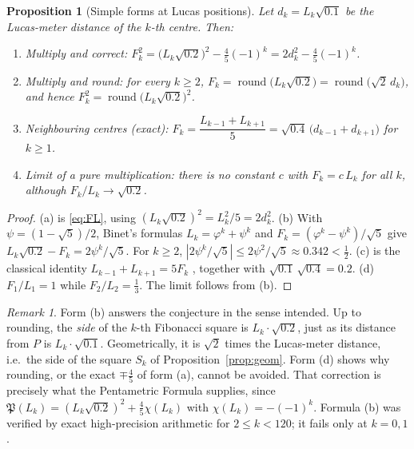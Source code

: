 \documentclass[11pt,a4paper]{article}
\newcommand{\Pent}{\mathfrak{P}}                      %
\theoremstyle{plain}
\newtheorem{proposition}[theorem]{Proposition}
\theoremstyle{definition}
\theoremstyle{remark}
\newtheorem{remark}[theorem]{Remark}
\begin{document}
\begin{proposition}[Simple forms at Lucas positions]\label{prop:simple}
Let $d_k=L_k\sqrt{0.1}$ be the Lucas-meter distance of the $k$-th centre. Then:
\begin{enumerate}[label=(\alph*),itemsep=3pt]
  \item \emph{Multiply and correct:} $F_k^{2}=\bigl(L_k\sqrt{0.2}\bigr)^{2}-\tfrac45(-1)^{k}=2d_k^{2}-\tfrac45(-1)^{k}$.
  \item \emph{Multiply and round:} for every $k\ge2$, $F_k=\operatorname{round}\bigl(L_k\sqrt{0.2}\bigr)=\operatorname{round}\bigl(\sqrt2\,d_k\bigr)$, and hence $F_k^{2}=\operatorname{round}\bigl(L_k\sqrt{0.2}\bigr)^{2}$.
  \item \emph{Neighbouring centres (exact):} $F_k=\dfrac{L_{k-1}+L_{k+1}}{5}=\sqrt{0.4}\,\bigl(d_{k-1}+d_{k+1}\bigr)$ for $k\ge1$.
  \item \emph{Limit of a pure multiplication:} there is no constant $c$ with $F_k=c\,L_k$ for all $k$, although $F_k/L_k\to\sqrt{0.2}$.
\end{enumerate}
\end{proposition}

\begin{proof}
(a) is \eqref{eq:FL}, using $(L_k\sqrt{0.2})^{2}=L_k^{2}/5=2d_k^{2}$.
(b) With $\psi=(1-\sqrt5)/2$, Binet's formulas $L_k=\varphi^{k}+\psi^{k}$ and $F_k=(\varphi^{k}-\psi^{k})/\sqrt5$ give $L_k\sqrt{0.2}-F_k=2\psi^{k}/\sqrt5$. For $k\ge2$, $|2\psi^{k}/\sqrt5|\le2\psi^{2}/\sqrt5\approx0.342<\tfrac12$.
(c) is the classical identity $L_{k-1}+L_{k+1}=5F_k$ \cite{Koshy2001}, together with $\sqrt{0.1}\,\sqrt{0.4}=0.2$.
(d) $F_1/L_1=1$ while $F_2/L_2=\tfrac13$. The limit follows from (b).
\end{proof}

\begin{remark}
Form (b) answers the conjecture in the sense intended. Up to rounding, the \emph{side} of the $k$-th Fibonacci square is $L_k\cdot\sqrt{0.2}$, just as its distance from $P$ is $L_k\cdot\sqrt{0.1}$. Geometrically, it is $\sqrt2$ times the Lucas-meter distance, i.e.\ the side of the square $S_k$ of Proposition~\ref{prop:geom}. Form (d) shows why rounding, or the exact $\mp\tfrac45$ of form (a), cannot be avoided. That correction is precisely what the Pentametric Formula supplies, since $\Pent(L_k)=(L_k\sqrt{0.2})^{2}+\tfrac45\chi(L_k)$ with $\chi(L_k)=-(-1)^{k}$. Formula (b) was verified by exact high-precision arithmetic for $2\le k<120$; it fails only at $k=0,1$.
\end{remark}
\end{document}

